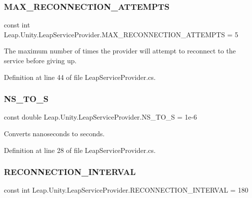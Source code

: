 \subsubsection{\texorpdfstring{MAX\_RECONNECTION\_ATTEMPTS}{MAX\_RECONNECTION\_ATTEMPTS}}
{\footnotesize\ttfamily const int Leap.\+Unity.\+Leap\+Service\+Provider.\+M\+A\+X\+\_\+\+R\+E\+C\+O\+N\+N\+E\+C\+T\+I\+O\+N\+\_\+\+A\+T\+T\+E\+M\+P\+TS = 5\hspace{0.3cm}{\ttfamily [protected]}}



The maximum number of times the provider will attempt to reconnect to the service before giving up. 



Definition at line 44 of file Leap\+Service\+Provider.\+cs.

\mbox{\label{class_leap_1_1_unity_1_1_leap_service_provider_aa3d28ca766e114835e7571397a97c865}} 
\subsubsection{\texorpdfstring{NS\_TO\_S}{NS\_TO\_S}}
{\footnotesize\ttfamily const double Leap.\+Unity.\+Leap\+Service\+Provider.\+N\+S\+\_\+\+T\+O\+\_\+S = 1e-\/6\hspace{0.3cm}{\ttfamily [protected]}}



Converts nanoseconds to seconds. 



Definition at line 28 of file Leap\+Service\+Provider.\+cs.

\mbox{\label{class_leap_1_1_unity_1_1_leap_service_provider_a4ecb0067ea35eec0a76e7f839547e9b0}} 
\subsubsection{\texorpdfstring{RECONNECTION\_INTERVAL}{RECONNECTION\_INTERVAL}}
{\footnotesize\ttfamily const int Leap.\+Unity.\+Leap\+Service\+Provider.\+R\+E\+C\+O\+N\+N\+E\+C\+T\+I\+O\+N\+\_\+\+I\+N\+T\+E\+R\+V\+AL = 180\hspace{0.3cm}{\ttfamily [protected]}}



